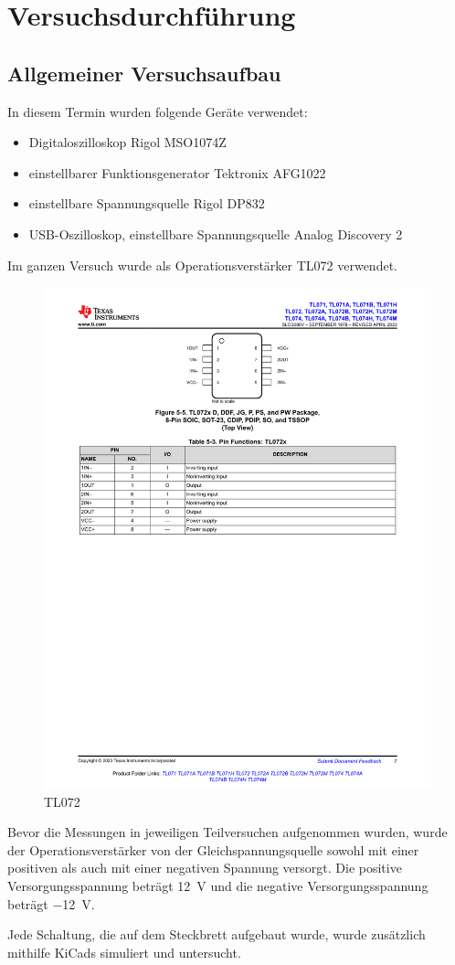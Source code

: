 
\section{Versuchsdurchführung}
%

\subsection{ Allgemeiner Versuchsaufbau}

In diesem Termin wurden folgende Geräte verwendet:
%
\begin{itemize}
    \item  Digitaloszilloskop Rigol MSO1074Z
    \item einstellbarer Funktionsgenerator Tektronix AFG1022
    \item einstellbare Spannungsquelle Rigol DP832
    \item USB-Oszilloskop, einstellbare Spannungsquelle Analog Discovery 2
\end{itemize}

Im ganzen Versuch wurde als Operationsverstärker TL072 verwendet.

\begin{figure}[H]
  \centering
  \includegraphics[width=0.4\linewidth]{Elektronik-Laborprotokoll_Filter/Abbildungen/Tl072_Datenblatt.pdf}
  \caption{TL072 \cite{Datenblatt:TL072}}
  \label{fig:Datenblatt}
\end{figure}

Bevor die Messungen in jeweiligen Teilversuchen aufgenommen wurden, wurde der Operationsverstärker von der Gleichspannungsquelle sowohl mit einer positiven als auch mit einer negativen Spannung versorgt. Die positive Versorgungsspannung beträgt \SI{12}{\volt} und die negative Versorgungsspannung beträgt \SI{-12}{\volt}.

Jede Schaltung, die auf dem Steckbrett aufgebaut wurde, wurde zusätzlich mithilfe KiCads simuliert und untersucht.

